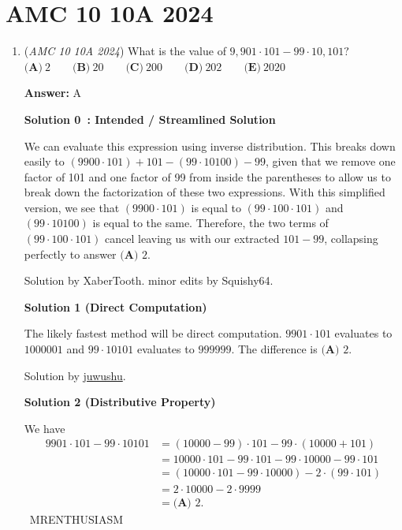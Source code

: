 \section{AMC 10 10A 2024}
        \begin{enumerate}
        	\item (\textit{AMC 10 10A 2024}) What is the value of $9,901\cdot101-99\cdot10,101?$
$\textbf{(A)}~2\qquad\textbf{(B)}~20\qquad\textbf{(C)}~200\qquad\textbf{(D)}~202\qquad\textbf{(E)}~2020$

 \textbf{Answer: }A



\textbf{Solution 0 : Intended / Streamlined Solution}

We can evaluate this expression using inverse distribution. This breaks down easily to $(9900\cdot101) + 101 - (99\cdot10100) - 99$, given that we remove one factor of 101 and one factor of 99 from inside the parentheses to allow us to break down the factorization of these two expressions. With this simplified version, we see that $(9900\cdot101)$ is equal to $(99\cdot100\cdot101)$ and $(99\cdot10100)$ is equal to the same. Therefore, the two terms of $(99\cdot100\cdot101)$ cancel leaving us with our extracted $101 - 99$, collapsing perfectly to answer $\boxed{\textbf{(A) }2}.$

 Solution by XaberTooth. minor edits by Squishy64.

 



\textbf{Solution 1 (Direct Computation)}

The likely fastest method will be direct computation. $9901\cdot101$ evaluates to $1000001$ and $99\cdot10101$ evaluates to $999999$. The difference is $\boxed{\textbf{(A) }2}.$

 Solution by \href{https://artofproblemsolving.com/wiki/index.php?title=User:Juwushu}{juwushu}.

 



\textbf{Solution 2 (Distributive Property)}

We have
 \begin{align*} 9901\cdot101-99\cdot10101 &= (10000-99)\cdot101-99\cdot(10000+101) \\ &= 10000\cdot101-99\cdot101-99\cdot10000-99\cdot101 \\ &= (10000\cdot101-99\cdot10000)-2\cdot(99\cdot101) \\ &= 2\cdot10000-2\cdot9999 \\ &= \boxed{\textbf{(A) }2}. \end{align*}
~MRENTHUSIASM


\end{enumerate}
